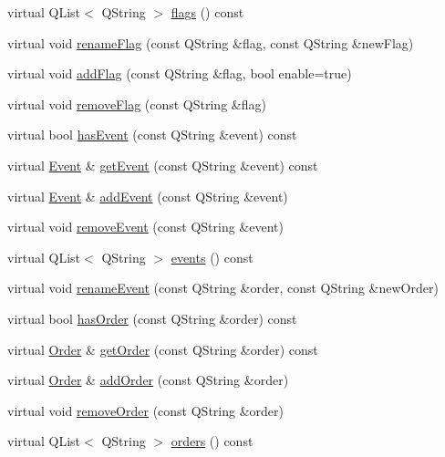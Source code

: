 \begin{DoxyCompactItemize}
\item 
virtual \-Q\-List$<$ \-Q\-String $>$ \hyperlink{class_game_object_aa4e80649831f355c14f35f0f9374c691}{flags} () const 
\item 
virtual void \hyperlink{class_game_object_a949ff1c62139b7f41142cc13482357e6}{rename\-Flag} (const \-Q\-String \&flag, const \-Q\-String \&new\-Flag)
\item 
virtual void \hyperlink{class_game_object_ad466ce6d9d70cf2d9127e43113f1de0a}{add\-Flag} (const \-Q\-String \&flag, bool enable=true)
\item 
virtual void \hyperlink{class_game_object_a56d6296edaf45ff99cb03be0598a7c69}{remove\-Flag} (const \-Q\-String \&flag)
\item 
virtual bool \hyperlink{class_game_object_a1bb4b921fe5335ad4513e6edcac64deb}{has\-Event} (const \-Q\-String \&event) const 
\item 
virtual \hyperlink{class_event}{\-Event} \& \hyperlink{class_game_object_a1c078d9c696beb125a3023434cf40053}{get\-Event} (const \-Q\-String \&event) const 
\item 
virtual \hyperlink{class_event}{\-Event} \& \hyperlink{class_game_object_aea67f0a40c7712bc166719dac24a74e3}{add\-Event} (const \-Q\-String \&event)
\item 
virtual void \hyperlink{class_game_object_a6bd488a645ef815e7dad4597d546ef3a}{remove\-Event} (const \-Q\-String \&event)
\item 
virtual \-Q\-List$<$ \-Q\-String $>$ \hyperlink{class_game_object_a699357a06b42be80e5f6520320d14745}{events} () const 
\item 
virtual void \hyperlink{class_game_object_a2e42ac64287d04a860a5fc9048769384}{rename\-Event} (const \-Q\-String \&order, const \-Q\-String \&new\-Order)
\item 
virtual bool \hyperlink{class_game_object_a950961df9f6d207ffe3593617df9944e}{has\-Order} (const \-Q\-String \&order) const 
\item 
virtual \hyperlink{class_order}{\-Order} \& \hyperlink{class_game_object_a42b1228cdea6a0bbff4cdf8c8ee57db7}{get\-Order} (const \-Q\-String \&order) const 
\item 
virtual \hyperlink{class_order}{\-Order} \& \hyperlink{class_game_object_afac90ed78171419483b423716f09a030}{add\-Order} (const \-Q\-String \&order)
\item 
virtual void \hyperlink{class_game_object_af401f5dc6cabf3edd3f71e5c0766d681}{remove\-Order} (const \-Q\-String \&order)
\item 
virtual \-Q\-List$<$ \-Q\-String $>$ \hyperlink{class_game_object_aa11383114a5352c9215517553deb6878}{orders} () const 

\end{DoxyCompactItemize}
